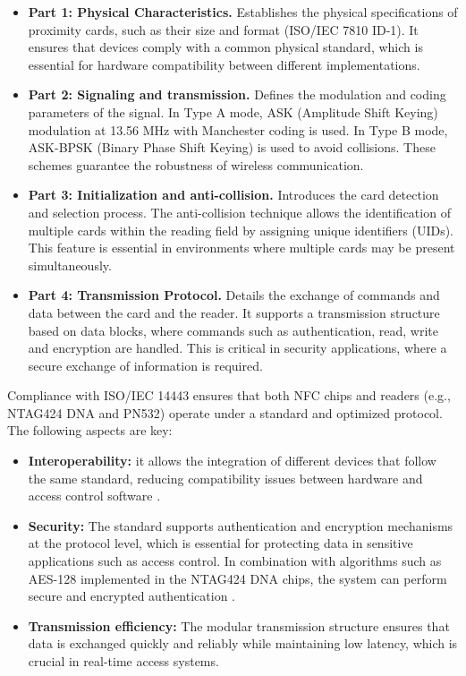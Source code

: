 \begin{itemize}
	\item \textbf{Part 1: Physical Characteristics.} Establishes the physical specifications of proximity cards, such as their size and format (ISO/IEC 7810 ID-1). It ensures that devices comply with a common physical standard, which is essential for hardware compatibility between different implementations.
	
	\item \textbf{Part 2: Signaling and transmission.} Defines the modulation and coding parameters of the signal. In Type A mode, ASK (Amplitude Shift Keying) modulation at 13.56 MHz with Manchester coding is used. In Type B mode, ASK-BPSK (Binary Phase Shift Keying) is used to avoid collisions. These schemes guarantee the robustness of wireless communication.
	
	\item \textbf{Part 3: Initialization and anti-collision.} Introduces the card detection and selection process. The anti-collision technique allows the identification of multiple cards within the reading field by assigning unique identifiers (UIDs). This feature is essential in environments where multiple cards may be present simultaneously.
	
	\item \textbf{Part 4: Transmission Protocol.} Details the exchange of commands and data between the card and the reader. It supports a transmission structure based on data blocks, where commands such as authentication, read, write and encryption are handled. This is critical in security applications, where a secure exchange of information is required.
\end{itemize}

Compliance with ISO/IEC 14443 ensures that both NFC chips and readers (e.g., NTAG424 DNA and PN532) operate under a standard and optimized protocol. The following aspects are key:

\begin{itemize}
	\item \textbf{Interoperability:} it allows the integration of different devices that follow the same standard, reducing compatibility issues between hardware and access control software \cite{Ref66}.
	
	\item \textbf{Security:} The standard supports authentication and encryption mechanisms at the protocol level, which is essential for protecting data in sensitive applications such as access control. In combination with algorithms such as AES-128 implemented in the NTAG424 DNA chips, the system can perform secure and encrypted authentication \cite{Ref67}.
	
	\item \textbf{Transmission efficiency:} The modular transmission structure ensures that data is exchanged quickly and reliably while maintaining low latency, which is crucial in real-time access systems.
\end{itemize}

